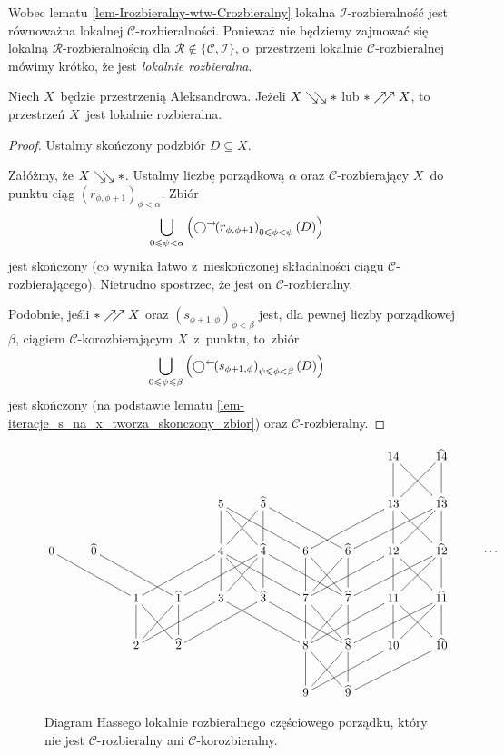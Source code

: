 Wobec lematu \ref{lem-Irozbieralny-wtw-Crozbieralny} lokalna $\mathcal{I}$-rozbieralność jest równoważna lokalnej \mbox{$\mathcal{C}$-rozbieralności}. Ponieważ nie będziemy zajmować się lokalną \mbox{$\mathcal{R}$-rozbieralnością} dla $\mathcal{R}\not\in\{\mathcal{C},\mathcal{I}\}$, o~przestrzeni lokalnie \mbox{$\mathcal{C}$-rozbieralnej} mówimy krótko, że jest \textit{lokalnie rozbieralna}.

\begin{lem}\label{lem-rozb_to_slabo_rozb}
Niech $X$~będzie przestrzenią Aleksandrowa. Jeżeli $X\searrow\!\!\searrow *$ lub $*\nearrow\!\!\nearrow X$, to przestrzeń $X$~jest lokalnie rozbieralna.
\end{lem}
\begin{proof}
Ustalmy skończony podzbiór $D\subseteq X$.

Załóżmy, że $X\searrow\!\!\searrow *$. Ustalmy liczbę porządkową $\alpha$ oraz $\mathcal{C}$-rozbierający $X$~do punktu ciąg $\left(r_{\phi,\phi+1}\right)_{\phi<\alpha}$. Zbiór \[\bigcup_{0\leqslant \psi<\alpha}\left(\bigcirc^\rightarrow\!\!\left(r_{\phi,\phi+1}\right)_{0\leqslant\phi<\psi}(D)\right)\] jest skończony (co wynika łatwo z~nieskończonej składalności ciągu \mbox{$\mathcal{C}$-rozbierającego}). Nietrudno spostrzec, że jest on \mbox{$\mathcal{C}$-rozbieralny}.

Podobnie, jeśli $*\nearrow\!\!\nearrow X$ oraz $\left(s_{\phi+1,\phi}\right)_{\phi<\beta}$ jest, dla pewnej liczby porządkowej $\beta$, ciągiem $\mathcal{C}$-korozbierającym $X$~z~punktu, to~zbiór \[\bigcup_{0\leqslant \psi\leqslant \beta}\left(\bigcirc^\leftarrow\!\!\left(s_{\phi+1,\phi}\right)_{\psi\leqslant \phi<\beta}(D)\right)\] jest skończony (na podstawie lematu \ref{lem-iteracje_s_na_x_tworza_skonczony_zbior}) oraz $\mathcal{C}$-rozbieralny.
\end{proof}

\begin{figure}[h]
\[
\xymatrix@R=25pt@C=25pt{
&&		&		&		&		&		&		& 14\ar@{-}[d]\ar@{-}[dr]	& \widehat{14}\ar@{-}[d]\ar@{-}[dl]\\
&&		&		& 5\ar@{-}[d]\ar@{-}[dr]\ar@{-}[drr]	& \widehat{5}\ar@{-}[d]\ar@{-}[dl]\ar@{-}[drr]	&		&		& 13\ar@{-}[d]\ar@{-}[dr]\ar@{-}[dll]	& \widehat{13}\ar@{-}[d]\ar@{-}[dl]\ar@{-}[dll]\\
0\ar@{-}[drr] & \widehat{0}\ar@{-}[drr]	&	&		& 4\ar@{-}[d]\ar@{-}[dr]\ar@{-}[dll]\ar@{-}[drr]	& \widehat{4}\ar@{-}[d]\ar@{-}[dl]\ar@{-}[dll]\ar@{-}[drr]	& 6\ar@{-}[d]\ar@{-}[dr]	& \widehat{6}\ar@{-}[d]\ar@{-}[dl]	& 12\ar@{-}[d]\ar@{-}[dr]\ar@{-}[dll]	& \widehat{12}\ar@{-}[d]\ar@{-}[dl]\ar@{-}[dll] & \cdots\\
&&1\ar@{-}[d]\ar@{-}[dr]	& \widehat{1}\ar@{-}[d]\ar@{-}[dl]	& 3\ar@{-}[dll]\ar@{-}[drr]	& \widehat{3}\ar@{-}[dll]\ar@{-}[drr]	& 7\ar@{-}[d]\ar@{-}[dr]	& \widehat{7}\ar@{-}[d]\ar@{-}[dl]	& 11\ar@{-}[d]\ar@{-}[dr]\ar@{-}[dll]	& \widehat{11}\ar@{-}[d]\ar@{-}[dl]\ar@{-}[dll]\\
&&2		& \widehat{2}	& 		& 		& 8\ar@{-}[d]\ar@{-}[dr]	& \widehat{8}\ar@{-}[d]\ar@{-}[dl]	& 10\ar@{-}[dll]	& \widehat{10}\ar@{-}[dll]\\
&&		&		&		&		& 9	& \widehat{9}}
\]
\caption{Diagram Hassego lokalnie rozbieralnego częściowego porządku, który nie jest $\mathcal{C}$-rozbieralny ani $\mathcal{C}$-korozbieralny.}\label{slabo_rozb_ale_nie_rozb}
\end{figure}


